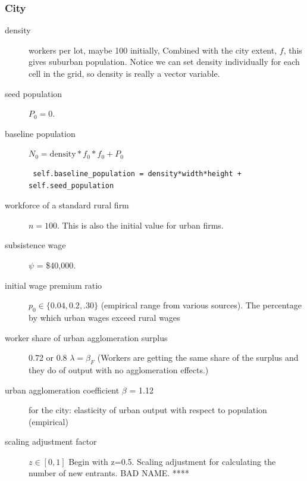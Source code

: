 \subsubsection{City}
\begin{description}
\item [density] workers per lot, maybe 100 initially, Combined with the city extent, $f$, this gives suburban population. %
Notice we can set density individually for each cell in the grid, so density is really a vector variable.  %
\item [seed population] $P_0=0$. %
\item [baseline population]  $N_0=\mathrm{density} * f_0 * f_0 + P_0$ 
\begin{lstlisting}
 self.baseline_population = density*width*height + self.seed_population
\end{lstlisting}

\item [workforce of a standard rural firm] $n=100$. This is also the initial value for urban firms.


\item [subsistence wage] $\psi$ = \$40,000. %


\item [initial wage premium ratio] $p_0\in\{0.04,0.2,.30\}$ (empirical range from various sources). The percentage by which urban wages exceed rural wages 
\item [worker share of urban agglomeration surplus] 0.72 or 0.8 $\lambda=\beta_F$ (Workers are getting the same share of the surplus and they do of output with no agglomeration effects.)
\item [urban agglomeration coefficient $\beta$ = 1.12] for the city: elasticity of urban output with respect to population (empirical)

\item [scaling adjustment factor] $z\in[0,1]$ Begin with z=0.5. Scaling adjustment for calculating the number of new entrants. BAD NAME. ****


\end{description}
